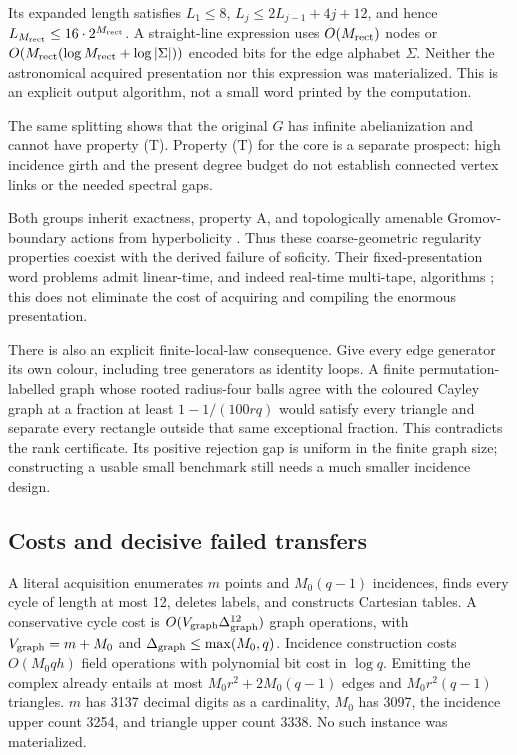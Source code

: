 \documentclass[11pt]{article}
\theoremstyle{definition}
\begin{document}
Its expanded length satisfies
$L_1\le8$, $L_j\le2L_{j-1}+4j+12$, and hence
$L_{M_{\rm rect}}\le16\cdot2^{M_{\rm rect}}$.
A straight-line expression uses $O(M_{\rm rect})$ nodes or
$O(M_{\rm rect}(\log M_{\rm rect}+\log|\Sigma|))$ encoded bits
for the edge alphabet $\Sigma$.
Neither the astronomical acquired presentation nor this expression
was materialized. This is an explicit output algorithm, not a small
word printed by the computation.

The same splitting shows that the original $G$ has infinite
abelianization and cannot have property (T).
Property (T) for the core is a separate prospect: high incidence
girth and the present degree budget do not establish connected
vertex links or the needed spectral gaps.

Both groups inherit exactness, property A, and topologically amenable
Gromov-boundary actions from hyperbolicity \cite{ozawa}. Thus these
coarse-geometric regularity properties coexist with the derived
failure of soficity. Their fixed-presentation word problems admit
linear-time, and indeed real-time multi-tape, algorithms
\cite{holtrees}; this does not eliminate the cost of acquiring and
compiling the enormous presentation.

There is also an explicit finite-local-law consequence. Give every
edge generator its own colour, including tree generators as identity
loops. A finite permutation-labelled graph whose rooted radius-four
balls agree with the coloured Cayley graph at a fraction at least
$1-1/(100rq)$ would satisfy every triangle and separate every
rectangle outside that same exceptional fraction. This contradicts
the rank certificate. Its positive rejection gap is uniform in the
finite graph size; constructing a usable small benchmark still needs
a much smaller incidence design.

\subsection{Costs and decisive failed transfers}
A literal acquisition enumerates $m$ points and $M_0(q-1)$
incidences, finds every cycle of length at most 12, deletes labels,
and constructs Cartesian tables. A conservative cycle cost is
$O(V_{\rm graph}\Delta_{\rm graph}^{12})$ graph operations, with
$V_{\rm graph}=m+M_0$ and
$\Delta_{\rm graph}\le\max(M_0,q)$. Incidence construction costs
$O(M_0qh)$ field operations with polynomial bit cost in $\log q$.
Emitting the complex already entails at most
$M_0r^2+2M_0(q-1)$ edges and $M_0r^2(q-1)$ triangles.
$m$ has 3137 decimal digits as a cardinality, $M_0$ has 3097,
the incidence upper count 3254, and triangle upper count 3338.
No such instance was materialized.
\end{document}
